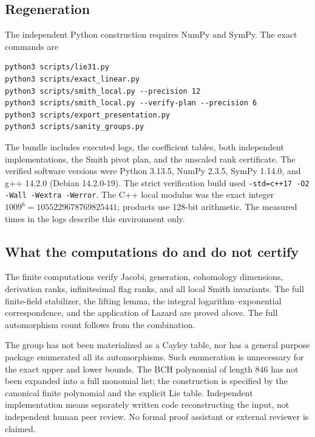 \documentclass[11pt]{article}
\theoremstyle{definition}\newtheorem{definition}[theorem]{Definition}
\theoremstyle{remark}\newtheorem{remark}[theorem]{Remark}
\begin{document}
\subsection{Regeneration}
The independent Python construction requires NumPy and SymPy. The exact
commands are
\begin{verbatim}
python3 scripts/lie31.py
python3 scripts/exact_linear.py
python3 scripts/smith_local.py --precision 12
python3 scripts/smith_local.py --verify-plan --precision 6
python3 scripts/export_presentation.py
python3 scripts/sanity_groups.py
\end{verbatim}
The bundle includes executed logs, the coefficient tables, both independent
implementations, the Smith pivot plan, and the unscaled rank certificate.
The verified software versions were Python 3.13.5, NumPy 2.3.5, SymPy 1.14.0,
and g++ 14.2.0 (Debian 14.2.0-19). The strict verification build used
\texttt{-std=c++17 -O2 -Wall -Wextra -Werror}.
The C++ local modulus was the exact integer
$1009^6=1055229678769825441$; products use 128-bit arithmetic.
The measured times in the logs describe this environment only.

\subsection{What the computations do and do not certify}
The finite computations verify Jacobi, generation, cohomology dimensions,
derivation ranks, infinitesimal flag ranks, and all local Smith invariants.
The full finite-field stabilizer, the lifting lemma, the integral
logarithm--exponential correspondence, and the application of Lazard are
proved above. The full automorphism count follows from the combination.

The group has not been materialized as a Cayley table, nor has a general
purpose package enumerated all its automorphisms. Such enumeration is
unnecessary for the exact upper and lower bounds. The BCH polynomial of
length $846$ has not been expanded into a full monomial list; the construction
is specified by the canonical finite polynomial and the explicit Lie table.
Independent implementation means separately written code reconstructing the
input, not independent human peer review. No formal proof assistant or
external reviewer is claimed.

\appendix
\end{document}
